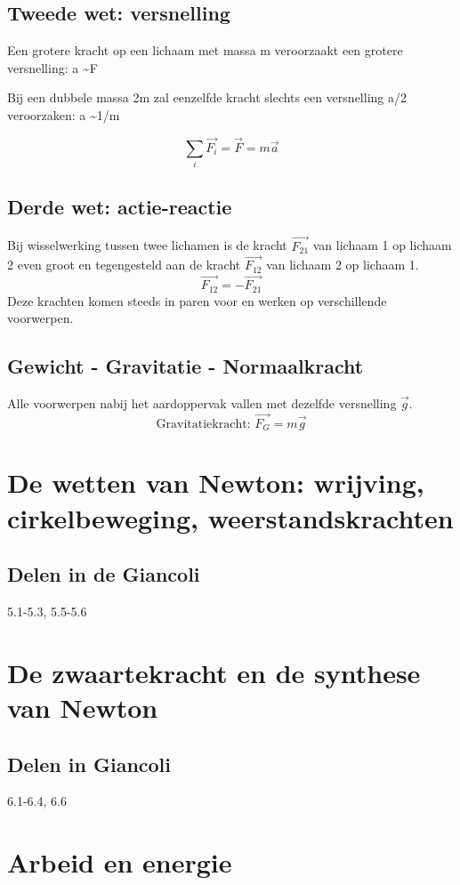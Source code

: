 \documentclass[12pt,a4paper]{article}
\begin{document}
    \subsection{Tweede wet: versnelling}
    Een grotere kracht op een lichaam met massa m veroorzaakt een grotere versnelling: a \textasciitilde F

    Bij een dubbele massa 2m zal eenzelfde kracht slechts een versnelling a/2 veroorzaken: a \textasciitilde 1/m

    \[\sum_{i} \vec{F_i} = \vec{F} = m\vec{a}\]

    \subsection{Derde wet: actie-reactie}
    Bij wisselwerking tussen twee lichamen is de kracht \(\vec{F_{21}}\) van lichaam 1 op lichaam 2 even groot en tegengesteld aan de kracht \(\vec{F_{12}}\) van lichaam 2 op lichaam 1.
    \[\vec{F_{12}} = -\vec{F_{21}}\]
    Deze krachten komen steeds in paren voor en werken op verschillende voorwerpen.

    \subsection{Gewicht - Gravitatie - Normaalkracht}
    Alle voorwerpen nabij het aardoppervak vallen met dezelfde versnelling $\vec{g}$.
    \[\text{Gravitatiekracht: } \vec{F_G} = m\vec{g}\]


    \section{De wetten van Newton: wrijving, cirkelbeweging, weerstandskrachten}

    \subsection{Delen in de Giancoli}
    5.1-5.3, 5.5-5.6


    \section{De zwaartekracht en de synthese van Newton}

    \subsection{Delen in Giancoli}
    6.1-6.4, 6.6


    \section{Arbeid en energie}
\end{document}
